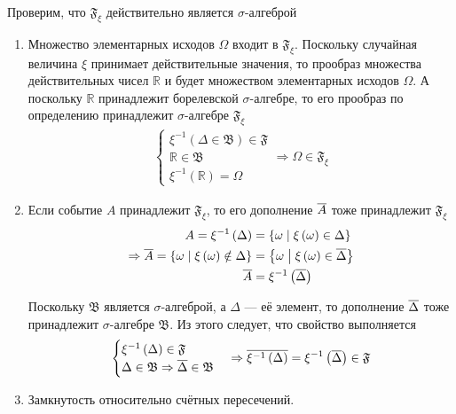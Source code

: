 Проверим, что $\mathfrak{F}_\xi$ действительно является $\sigma$-алгеброй
\begin{enumerate}
  \item Множество элементарных исходов $\Omega$ входит в $\mathfrak{F}_\xi$.
      Поскольку случайная величина $\xi$ принимает действительные значения,
      то прообраз множества действительных чисел $\mathbb{R}$
      и будет множеством элементарных исходов $\Omega$.
      А поскольку $\mathbb{R}$ принадлежит борелевской $\sigma$-алгебре,
      то его прообраз по определению принадлежит
      $\sigma$-алгебре $\mathfrak{F}_\xi$
      \begin{align*}
      \begin{cases}
          \xi^{-1}\left( \Delta \in \mathfrak{B} \right) \in\mathfrak{F}\\
          \mathbb{R}\in\mathfrak{B}\\
          \xi^{-1}\left( \mathbb{R} \right)= \Omega
      \end{cases}
      \Rightarrow
      \Omega \in \mathfrak{F}_\xi
      \end{align*}
  \item Если событие $A$ принадлежит $\mathfrak{F}_\xi$,
      то его дополнение $\overline{A}$ тоже принадлежит $\mathfrak{F}_\xi$
      \begin{align*}
      A= \xi^{-1}\left( \Delta \right)
          &= \left\{ \omega \;\middle|\; \xi\left( \omega \right)
        \in \Delta \right\}\\
      \Rightarrow
      \overline{A}
          = \left\{ \omega \;\middle|\; \xi\left( \omega \right)
        \notin \Delta \right\}
          &= \left\{ \omega \;\middle|\; \xi\left( \omega \right)
        \in \overline{\Delta}\right\}\\
      \overline{A}&= \xi^{-1}\left( \overline{\Delta} \right)
      \end{align*}

      Поскольку $\mathfrak{B}$ является $\sigma$-алгеброй,
      а $\Delta$ --- её элемент,
      то дополнение $\overline{\Delta}$ тоже принадлежит
      $\sigma$-алгебре $\mathfrak{B}$.
      Из этого следует, что свойство выполняется
      \begin{align*}
      \begin{cases}
          \xi^{-1}\left( \Delta \right) \in \mathfrak{F}\\
          \Delta \in \mathfrak{B}
        \Rightarrow \overline{\Delta} \in \mathfrak{B}
      \end{cases}
      \Rightarrow
      \overline{\xi^{-1}\left( \Delta \right)}
          = \xi^{-1}\left( \overline{\Delta} \right) \in \mathfrak{F}
      \end{align*}
  \item Замкнутость относительно счётных пересечений.


\end{enumerate}
